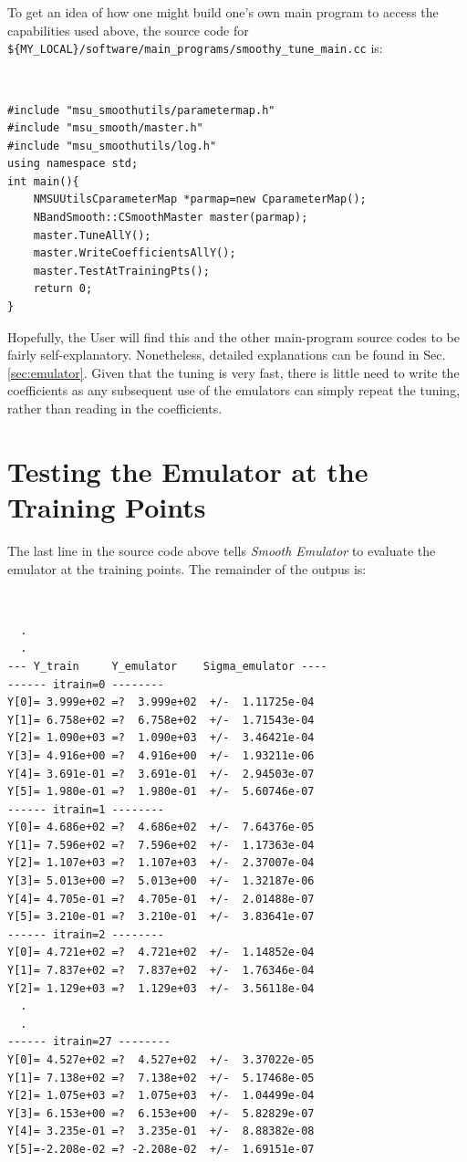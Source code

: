 \documentclass[UserManual.tex]{subfiles}
\begin{document}
To get an idea of how one might build one's own main program to access the capabilities used above, the source code for {\tt \$\{MY\_LOCAL\}/software/main\_programs/smoothy\_tune\_main.cc} is:
{\tt
\begin{verbatim}
#include "msu_smoothutils/parametermap.h"
#include "msu_smooth/master.h"
#include "msu_smoothutils/log.h"
using namespace std;
int main(){
	NMSUUtilsCparameterMap *parmap=new CparameterMap();
	NBandSmooth::CSmoothMaster master(parmap);	
	master.TuneAllY();
	master.WriteCoefficientsAllY();
	master.TestAtTrainingPts();
	return 0;
}
\end{verbatim}}
Hopefully, the User will find this and the other main-program source codes to be fairly self-explanatory. Nonetheless, detailed explanations can be found in Sec. \ref{sec:emulator}. Given that the tuning is very fast, there is little need to write the coefficients as any subsequent use of the emulators can simply repeat the tuning, rather than reading in the coefficients.

\section{Testing the Emulator at the Training Points}
The last line in the source code above tells {\it Smooth Emulator} to evaluate the emulator at the training points. The remainder of the outpus is:
{\tt
\begin{verbatim}
  .
  .
--- Y_train     Y_emulator    Sigma_emulator ----
------ itrain=0 --------
Y[0]= 3.999e+02 =?  3.999e+02  +/-  1.11725e-04
Y[1]= 6.758e+02 =?  6.758e+02  +/-  1.71543e-04
Y[2]= 1.090e+03 =?  1.090e+03  +/-  3.46421e-04
Y[3]= 4.916e+00 =?  4.916e+00  +/-  1.93211e-06
Y[4]= 3.691e-01 =?  3.691e-01  +/-  2.94503e-07
Y[5]= 1.980e-01 =?  1.980e-01  +/-  5.60746e-07
------ itrain=1 --------
Y[0]= 4.686e+02 =?  4.686e+02  +/-  7.64376e-05
Y[1]= 7.596e+02 =?  7.596e+02  +/-  1.17363e-04
Y[2]= 1.107e+03 =?  1.107e+03  +/-  2.37007e-04
Y[3]= 5.013e+00 =?  5.013e+00  +/-  1.32187e-06
Y[4]= 4.705e-01 =?  4.705e-01  +/-  2.01488e-07
Y[5]= 3.210e-01 =?  3.210e-01  +/-  3.83641e-07
------ itrain=2 --------
Y[0]= 4.721e+02 =?  4.721e+02  +/-  1.14852e-04
Y[1]= 7.837e+02 =?  7.837e+02  +/-  1.76346e-04
Y[2]= 1.129e+03 =?  1.129e+03  +/-  3.56118e-04
  .
  .
------ itrain=27 --------
Y[0]= 4.527e+02 =?  4.527e+02  +/-  3.37022e-05
Y[1]= 7.138e+02 =?  7.138e+02  +/-  5.17468e-05
Y[2]= 1.075e+03 =?  1.075e+03  +/-  1.04499e-04
Y[3]= 6.153e+00 =?  6.153e+00  +/-  5.82829e-07
Y[4]= 3.235e-01 =?  3.235e-01  +/-  8.88382e-08
Y[5]=-2.208e-02 =? -2.208e-02  +/-  1.69151e-07
\end{verbatim}}
\end{document}
